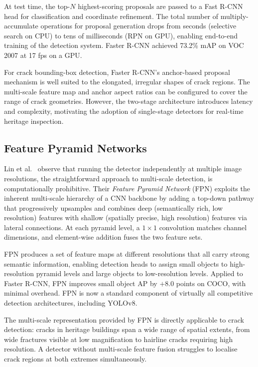 \documentclass[12pt,a4paper]{article}
\begin{document}
At test time, the top-$N$ highest-scoring proposals are passed to a Fast R-CNN head for classification and coordinate refinement. The total number of multiply-accumulate operations for proposal generation drops from seconds (selective search on CPU) to tens of milliseconds (RPN on GPU), enabling end-to-end training of the detection system. Faster R-CNN achieved 73.2\% mAP on VOC 2007 at 17 fps on a GPU.

For crack bounding-box detection, Faster R-CNN's anchor-based proposal mechanism is well suited to the elongated, irregular shapes of crack regions. The multi-scale feature map and anchor aspect ratios can be configured to cover the range of crack geometries. However, the two-stage architecture introduces latency and complexity, motivating the adoption of single-stage detectors for real-time heritage inspection.

\subsection{Feature Pyramid Networks}

Lin et al.~\cite{lin2017fpn} observe that running the detector independently at multiple image resolutions, the straightforward approach to multi-scale detection, is computationally prohibitive. Their \textit{Feature Pyramid Network} (FPN) exploits the inherent multi-scale hierarchy of a CNN backbone by adding a top-down pathway that progressively upsamples and combines deep (semantically rich, low resolution) features with shallow (spatially precise, high resolution) features via lateral connections. At each pyramid level, a $1\times1$ convolution matches channel dimensions, and element-wise addition fuses the two feature sets.

FPN produces a set of feature maps at different resolutions that all carry strong semantic information, enabling detection heads to assign small objects to high-resolution pyramid levels and large objects to low-resolution levels. Applied to Faster R-CNN, FPN improves small object AP by $+8.0$ points on COCO, with minimal overhead. FPN is now a standard component of virtually all competitive detection architectures, including YOLOv8.

The multi-scale representation provided by FPN is directly applicable to crack detection: cracks in heritage buildings span a wide range of spatial extents, from wide fractures visible at low magnification to hairline cracks requiring high resolution. A detector without multi-scale feature fusion struggles to localise crack regions at both extremes simultaneously.
\end{document}
